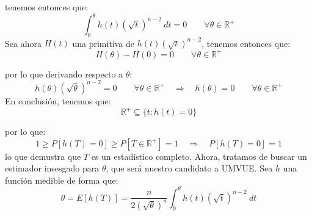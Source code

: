 \begin{ejercicio}
    tenemos entonces que:
    \begin{equation*}
        \int_{0}^{\theta} h(t){\left(\sqrt{t}\right)}^{n-2}~dt = 0 \qquad \forall \theta\in \mathbb{R}^+
    \end{equation*}
    Sea ahora $H(t)$ una primitiva de $h(t){\left(\sqrt{t}\right)}^{n-2}$, tenemos entonces que:
    \begin{equation*}
        H(\theta) - H(0) = 0 \qquad \forall \theta\in \mathbb{R}^+
    \end{equation*}

    por lo que derivando respecto a $\theta$:
    \begin{equation*}
        h(\theta) {\left(\sqrt{\theta}\right)}^{n-2} = 0 \qquad \forall \theta\in \mathbb{R}^+ \quad \Longrightarrow \quad  h(\theta) = 0 \qquad \forall \theta\in \mathbb{R}^+
    \end{equation*}
    En conclusión, tenemos que:
    \begin{equation*}
        \mathbb{R}^+ \subseteq \{t:h(t) = 0\}
    \end{equation*}

    por lo que:
    \begin{equation*}
        1 \geq P[h(T) = 0] \geq P[T\in \mathbb{R}^+] = 1 \quad \Longrightarrow \quad P[h(T)=0] = 1
    \end{equation*}
    lo que demustra que $T$ es un estadístico completo. Ahora, tratamos de buscar un estimador insesgado para $\theta$, que será nuestro candidato a UMVUE. Sea $h$ una función medible de forma que:
    \begin{equation*}
        \theta = E[h(T)] = \dfrac{n}{2{\left(\sqrt{\theta}\right)}^{n}}\int_{0}^{\theta} h(t){\left(\sqrt{t}\right)}^{n-2}~dt 
    \end{equation*} %
\end{ejercicio}


